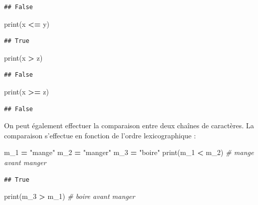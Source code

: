 \documentclass[12pt,]{book}
\newenvironment{Shaded}{\begin{snugshade}}{\end{snugshade}}
\newcommand{\StringTok}[1]{\textcolor[rgb]{0.31,0.60,0.02}{#1}}
\newcommand{\CommentTok}[1]{\textcolor[rgb]{0.56,0.35,0.01}{\textit{#1}}}
\newcommand{\OperatorTok}[1]{\textcolor[rgb]{0.81,0.36,0.00}{\textbf{#1}}}
\newcommand{\BuiltInTok}[1]{#1}
\newcommand{\NormalTok}[1]{#1}
\numberwithin{equation}{section}
\numberwithin{countremarque}{section}
\begin{document}
\begin{lstlisting}
## False
\end{lstlisting}

\begin{Shaded}
\begin{Highlighting}[]
\BuiltInTok{print}\NormalTok{(x }\OperatorTok{<=}\NormalTok{ y)}
\end{Highlighting}
\end{Shaded}

\begin{lstlisting}
## True
\end{lstlisting}

\begin{Shaded}
\begin{Highlighting}[]
\BuiltInTok{print}\NormalTok{(x }\OperatorTok{>}\NormalTok{ z)}
\end{Highlighting}
\end{Shaded}

\begin{lstlisting}
## False
\end{lstlisting}

\begin{Shaded}
\begin{Highlighting}[]
\BuiltInTok{print}\NormalTok{(x }\OperatorTok{>=}\NormalTok{ z)}
\end{Highlighting}
\end{Shaded}

\begin{lstlisting}
## False
\end{lstlisting}

On peut également effectuer la comparaison entre deux chaînes de
caractères. La comparaison s'effectue en fonction de l'ordre
lexicographique :

\begin{Shaded}
\begin{Highlighting}[]
\NormalTok{m_1 }\OperatorTok{=} \StringTok{"mange"}
\NormalTok{m_2 }\OperatorTok{=} \StringTok{"manger"}
\NormalTok{m_3 }\OperatorTok{=} \StringTok{"boire"}
\BuiltInTok{print}\NormalTok{(m_1 }\OperatorTok{<}\NormalTok{ m_2) }\CommentTok{# mange avant manger}
\end{Highlighting}
\end{Shaded}

\begin{lstlisting}
## True
\end{lstlisting}

\begin{Shaded}
\begin{Highlighting}[]
\BuiltInTok{print}\NormalTok{(m_3 }\OperatorTok{>}\NormalTok{ m_1) }\CommentTok{# boire avant manger}
\end{Highlighting}
\end{Shaded}
\end{document}
